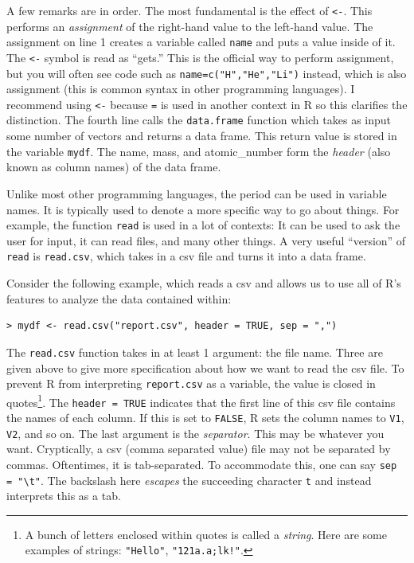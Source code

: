 \documentclass[12pt]{article}
\theoremstyle{remark}
\begin{document}
A few remarks are in order. The most fundamental is the effect of \verb|<-|. This performs an \emph{assignment} of the right-hand value to the left-hand value. The assignment on line 1 creates a variable called \verb|name| and puts a value inside of it. The \verb|<-| symbol is read as ``gets.'' This is the official way to perform assignment, but you will often see code such as \verb|name=c("H","He","Li")| instead, which is also assignment (this is common syntax in other programming languages). I recommend using \verb|<-| because \verb|=| is used in another context in R so this clarifies the distinction. The fourth line calls the \verb|data.frame| function which takes as input some number of vectors and returns a data frame. This return value is stored in the variable \verb|mydf|.  The name, mass, and atomic\_number form the \emph{header} (also known as column names) of the data frame.

Unlike most other programming languages, the period can be used in variable names. It is typically used to denote a more specific way to go about things. For example, the function \verb|read| is used in a lot of contexts: It can be used to ask the user for input, it can read files, and many other things. A very useful ``version'' of \verb|read| is \verb|read.csv|, which takes in a csv file and turns it into a data frame.

Consider the following example, which reads a csv and allows us to use all of R's features to analyze the data contained within:

\begin{verbatim}
> mydf <- read.csv("report.csv", header = TRUE, sep = ",")
\end{verbatim}

The \verb|read.csv| function takes in at least 1 argument: the file name. Three are given above to give more specification about how we want to read the csv file. To prevent R from interpreting \verb|report.csv| as a variable, the value is closed in quotes\footnote{A bunch of letters enclosed within quotes is called a \emph{string}. Here are some examples of strings: \texttt{"Hello"}, \texttt{"121a.a;lk!"}.}.
The \verb|header = TRUE| indicates that the first line of this csv file contains the names of each column. If this is set to \verb|FALSE|, R sets the column names to \verb|V1|, \verb|V2|, and so on. The last argument is the \emph{separator}. This may be whatever you want. Cryptically, a csv (comma separated value) file may not be separated by commas. Oftentimes, it is tab-separated. To accommodate this, one can say \verb|sep = "\t"|. The backslash here \emph{escapes} the succeeding character \verb|t| and instead interprets this as a tab.
\end{document}
